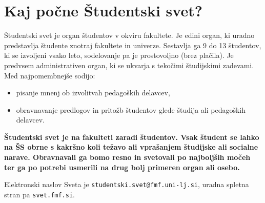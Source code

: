 \documentclass[a4paper,oneside,12pt]{article}
\title{\Title}
\author{\Author}
\date{\today}
\theoremstyle{definition}
\begin{document}

\section*{Kaj počne Študentski svet?}

Študentski svet je organ študentov v okviru fakultete. Je edini organ, ki uradno predstavlja
študente znotraj fakultete in univerze. Sestavlja ga 9 do 13 študentov, ki se izvoljeni vsako leto,
sodelovanje pa je prostovoljno (brez plačila). Je predvsem administrativen organ, ki se ukvarja s
tekočimi študijskimi zadevami. Med najpomembnejše sodijo:
\begin{itemize}
  \item pisanje mnenj ob izvolitvah pedagoških delavcev,
  \item obravnavanje predlogov in pritožb študentov glede študija ali pedagoških delavcev.
\end{itemize}

\textbf{Študentski svet je na fakulteti zaradi študentov. Vsak študent se lahko na ŠS obrne s
kakršno koli težavo ali vprašanjem študijske ali socialne narave. Obravnavali ga bomo resno in
svetovali po najboljših močeh ter ga po potrebi usmerili na drug bolj primeren organ ali osebo.}

Elektronski naslov Sveta je \texttt{studentski.svet@fmf.uni-lj.si}, uradna spletna stran pa
\texttt{svet.fmf.si}.
\end{document}
